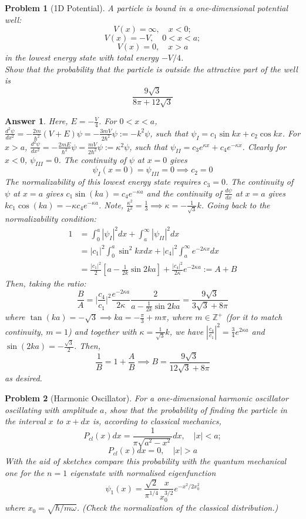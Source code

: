 \documentclass[a4paper]{article}
\newtheorem{ans}{Answer}[section]
\theoremstyle{new}
\newtheorem{qns}{Problem}[section]
\begin{document}
\newpage
\begin{qns}[1D Potential]
A particle is bound in a one-dimensional potential well:
$$V(x)=\infty,\quad x<0;$$
$$V(x)=-V,\quad 0<x<a;$$
$$V(x)=0,\quad x>a$$
in the lowest energy state with total energy $-V/4$.\\[5pt]
Show that the probability that the particle is outside the attractive part of the well is
$$\frac{9\sqrt{3}}{8\pi+12\sqrt{3}}$$
\end{qns}
\begin{ans}
Here, $E=-\frac{V}{4}$. For $0<x<a$, $\frac{d^2\psi}{dx^2}=-\frac{2m}{\hbar^2}(V+E)\psi=-\frac{3mV}{2\hbar^2}\psi:=-k^2\psi$, such that $\psi_I=c_1\sin kx+c_2\cos kx$. For $x>a$, $\frac{d^2\psi}{dx^2}=-\frac{2mE}{\hbar^2}\psi=\frac{mV}{2\hbar^2}\psi:=\kappa^2\psi$, such that $\psi_{II}=c_3e^{\kappa x}+c_4e^{-\kappa x}$. Clearly for $x<0$, $\psi_{III}=0$. The continuity of $\psi$ at $x=0$ gives
$$\psi_I(x=0)=\psi_{III}=0\implies c_2=0$$
The normalizability of this lowest energy state requires $c_3=0$. The continuity of $\psi$ at $x=a$ gives $c_1\sin(ka)=c_4e^{-\kappa a}$ and the continuity of $\frac{d\psi}{dx}$ at $x=a$ gives $kc_1\cos(ka)=-\kappa c_4e^{-\kappa a}$. Note, $\frac{\kappa^2}{k^2}=\frac{1}{3}\implies\kappa=-\frac{1}{\sqrt{3}}k$. Going back to the normalizability condition:
\begin{align}
1&=\int_0^a|\psi_I|^2dx+\int_a^\infty|\psi_{II}|^2dx\nonumber\\&=|c_1|^2\int_0^a\sin^2kxdx+|c_4|^2\int_a^\infty e^{-2\kappa x}dx\nonumber\\&=\frac{|c_1|^2}{2}[a-\frac{1}{2k}\sin 2ka]+\frac{|c_4|^2}{2\kappa}e^{-2\kappa a}:=A+B\nonumber
\end{align}
Then, taking the ratio:
$$\frac{B}{A}=\bigg|\frac{c_4}{c_1}\bigg|^2\frac{e^{-2\kappa a}}{2\kappa}\frac{2}{a-\frac{1}{2k}\sin 2ka}=\frac{9\sqrt{3}}{3\sqrt{3}+8\pi}$$
where $\tan(ka)=-\sqrt{3}\implies ka=-\frac{\pi}{3}+m\pi$, where $m\in\mathbb{Z}^+$ (for it to match continuity, $m=1$) and together with $\kappa=\frac{1}{\sqrt{3}}k$, we have $|\frac{c_4}{c_1}|^2=\frac{3}{4}e^{2\kappa a}$ and $\sin(2ka)=-\frac{\sqrt{3}}{2}$. Then,
$$\frac{1}{B}=1+\frac{A}{B}\implies B=\frac{9\sqrt{3}}{12\sqrt{3}+8\pi}$$
as desired.
\end{ans}
\newpage
\begin{qns}[Harmonic Oscillator]
For a one-dimensional harmonic oscillator oscillating with amplitude $a$, show that the probability of finding the particle in the interval $x$ to $x + dx$ is, according to classical mechanics,
$$P_{cl}(x)dx=\frac{1}{\pi\sqrt{a^2-x^2}}dx,\quad|x|<a;$$
$$P_{cl}(x)dx=0,\quad|x|>a$$
With the aid of sketches compare this probability with the quantum mechanical one for the $n = 1$ eigenstate with normalised eigenfunction
$$\psi_1(x)=\frac{\sqrt{2}}{\pi^{1/4}}\frac{x}{x_0^{3/2}}e^{-x^2/2x_0^2}$$
where $x_0=\sqrt{\hbar/m\omega}$. (Check the normalization of the classical distribution.)
\end{qns}
\end{document}
